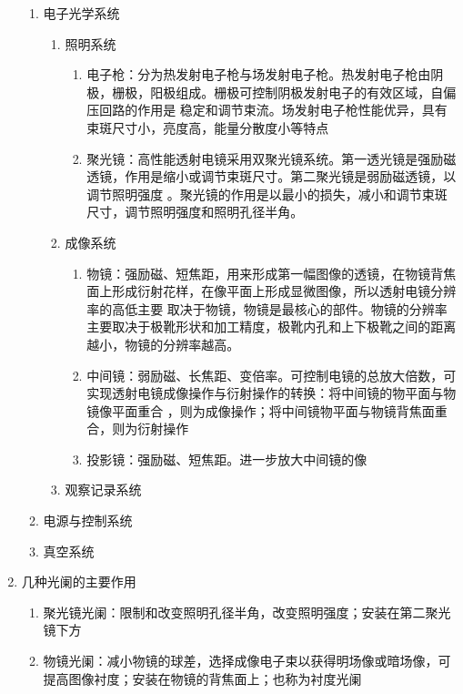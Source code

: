\documentclass[12pt,a4paper]{article}
\begin{document}
\begin{enumerate}
        \begin{enumerate}
            \item 电子光学系统
            \begin{enumerate}
                \item 照明系统
                \begin{enumerate}
                    \item 电子枪：分为热发射电子枪与场发射电子枪。热发射电子枪由阴极，栅极，阳极组成。栅极可控制阴极发射电子的有效区域，自偏压回路的作用是
                        稳定和调节束流。场发射电子枪性能优异，具有束斑尺寸小，亮度高，能量分散度小等特点
                    \item 聚光镜：高性能透射电镜采用双聚光镜系统。第一透光镜是强励磁透镜，作用是缩小或调节束斑尺寸。第二聚光镜是弱励磁透镜，以调节照明强度
                        。聚光镜的作用是以最小的损失，减小和调节束斑尺寸，调节照明强度和照明孔径半角。
                \end{enumerate}
                \item 成像系统
                \begin{enumerate}
                    \item 物镜：强励磁、短焦距，用来形成第一幅图像的透镜，在物镜背焦面上形成衍射花样，在像平面上形成显微图像，所以透射电镜分辨率的高低主要
                        取决于物镜，物镜是最核心的部件。物镜的分辨率主要取决于极靴形状和加工精度，极靴内孔和上下极靴之间的距离越小，物镜的分辨率越高。
                    \item 中间镜：弱励磁、长焦距、变倍率。可控制电镜的总放大倍数，可实现透射电镜成像操作与衍射操作的转换：将中间镜的物平面与物镜像平面重合
                        ，则为成像操作；将中间镜物平面与物镜背焦面重合，则为衍射操作
                    \item 投影镜：强励磁、短焦距。进一步放大中间镜的像
                \end{enumerate}
                \item 观察记录系统
            \end{enumerate}
            \item 电源与控制系统
            \item 真空系统
        \end{enumerate}
        \item 几种光阑的主要作用
        \begin{enumerate}
            \item 聚光镜光阑：限制和改变照明孔径半角，改变照明强度；安装在第二聚光镜下方
            \item 物镜光阑：减小物镜的球差，选择成像电子束以获得明场像或暗场像，可提高图像衬度；安装在物镜的背焦面上；也称为衬度光阑

\end{enumerate}
\end{enumerate}
\end{document}
